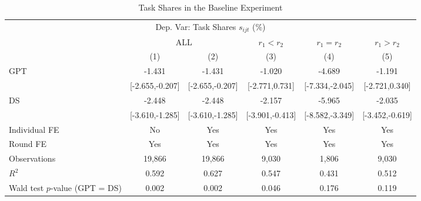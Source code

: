 \begin{table}[H]
\centering
\caption{Task Shares in the Baseline Experiment}
\footnotesize
\begin{threeparttable}
\begin{tabular}{l*{5}{c}}
\toprule\toprule
\multicolumn{6}{c}{Dep. Var: Task Shares $s_{ijt}$ (\%)} \\
 & \multicolumn{2}{c}{ALL} & \multicolumn{1}{c}{$r_1 < r_2$} & \multicolumn{1}{c}{$r_1 = r_2$} & \multicolumn{1}{c}{$r_1 > r_2$} \\
\cmidrule(lr){2-3} \cmidrule(lr){4-4} \cmidrule(lr){5-5} \cmidrule(lr){6-6}
            &\multicolumn{1}{c}{(1)}         &\multicolumn{1}{c}{(2)}         &\multicolumn{1}{c}{(3)}         &\multicolumn{1}{c}{(4)}         &\multicolumn{1}{c}{(5)}         \\
\midrule
GPT         &                -1.431\sym{*}  &                -1.431\sym{*}  &                -1.020         &                -4.689\sym{***}&                -1.191         \\
            &       [-2.655,-0.207]         &       [-2.655,-0.207]         &        [-2.771,0.731]         &       [-7.334,-2.045]         &        [-2.721,0.340]         \\
\addlinespace
DS          &                -2.448\sym{***}&                -2.448\sym{***}&                -2.157\sym{*}  &                -5.965\sym{***}&                -2.035\sym{**} \\
            &       [-3.610,-1.285]         &       [-3.610,-1.285]         &       [-3.901,-0.413]         &       [-8.582,-3.349]         &       [-3.452,-0.619]         \\
\midrule
Individual FE&                    No         &                   Yes         &                   Yes         &                   Yes         &                   Yes         \\
Round FE    &                   Yes         &                   Yes         &                   Yes         &                   Yes         &                   Yes         \\
Observations&                19,866         &                19,866         &                 9,030         &                 1,806         &                 9,030         \\
$R^2$       &                 0.592         &                 0.627         &                 0.547         &                 0.431         &                 0.512         \\
Wald test $p$-value (GPT = DS)&                 0.002         &                 0.002         &                 0.046         &                 0.176         &                 0.119         \\

\end{tabular}
\end{threeparttable}
\end{table}
